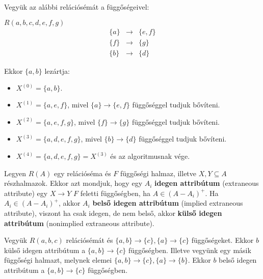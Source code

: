\begin{pld}
Vegyük az alábbi relációsémát a függőségeivel:
\begin{center}
    $R(a,b,c,d,e,f,g)$ \break
    $$
    \begin{matrix}
    \{a\} & \longrightarrow & \{e,f\} \\
    \{f\} & \longrightarrow & \{g\} \\
    \{b\} & \longrightarrow & \{d\}
    \end{matrix}
    $$
    
\end{center}
Ekkor $\{a,b\}$ lezártja:
\begin{itemize}
    \item $X^{(0)} = \{a,b\}.$
    \item $X^{(1)} = \{a,e,f\}$, mivel $\{a\} \longrightarrow \{e,f\}$ függőséggel tudjuk bővíteni.
    \item $X^{(2)} = \{a,e,f,g\}$, mivel $\{f\} \longrightarrow \{g\}$ függőséggel tudjuk bővíteni.
    \item $X^{(3)} = \{a,d,e,f,g\}$, mivel $\{b\} \longrightarrow \{d\}$ függőséggel tudjuk bővíteni.
    \item $X^{(4)} = \{a,d,e,f,g\} = X^{(3)}$ és az algoritmusnak vége.
\end{itemize}
\end{pld}

\begin{defi}
Legyen $R(A)$ egy relációséma és $F$ függőségi halmaz, illetve $X,Y \subseteq A$ részhalmazok. Ekkor azt mondjuk, hogy egy $A_i$ \textbf{idegen attribútum} (extraneous attribute) egy $X \longrightarrow Y$ $F$ feletti függőségben, ha $A \in (A-A_i)^+$. Ha $A_i \in (A-A_i)^+$, akkor $A_i$ \textbf{belső idegen attribútum} (implied extraneous attribute), viszont ha csak idegen, de nem belső, akkor \textbf{külső idegen attribútum} (nonimplied extraneous attribute).
\end{defi}

\begin{pld}
Vegyük $R(a,b,c)$ relációsémát és $\{a,b\} \longrightarrow \{c\}, \{a\} \longrightarrow \{c\}$ függőségeket. Ekkor $b$ külső idegen attribútum a $\{a,b\} \longrightarrow \{c\}$ függőségben. \hfill \break
Illetve vegyünk egy másik függőségi halmazt, melynek elemei $\{a,b\} \longrightarrow \{c\}, \{a\} \longrightarrow \{b\}$. Ekkor $b$ belső idegen attribútum a $\{a,b\} \longrightarrow \{c\}$ függőségben.
\end{pld}

